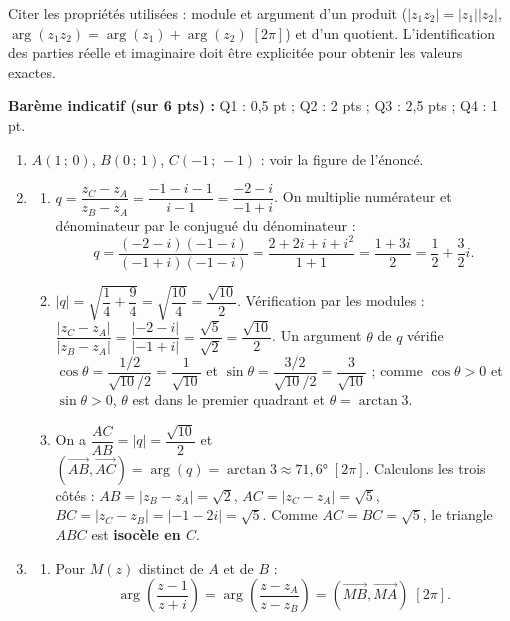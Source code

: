 \documentclass[11pt]{article}
\begin{document}
\begin{attention}
Citer les propriétés utilisées : module et argument d'un produit ($|z_1z_2| = |z_1||z_2|$, $\arg(z_1z_2) = \arg(z_1) + \arg(z_2)\;[2\pi]$) et d'un quotient. L'identification des parties réelle et imaginaire doit être explicitée pour obtenir les valeurs exactes.
\end{attention}

\begin{corrige}
\textbf{Barème indicatif (sur 6 pts) :} Q1 : 0,5 pt ; Q2 : 2 pts ; Q3 : 2,5 pts ; Q4 : 1 pt.

\begin{enumerate}
\item $A(1\,;\,0)$, $B(0\,;\,1)$, $C(-1\,;\,-1)$ : voir la figure de l'énoncé.
\item \begin{enumerate}
\item $q = \dfrac{z_C - z_A}{z_B - z_A} = \dfrac{-1 - i - 1}{i - 1} = \dfrac{-2 - i}{-1 + i}$. On multiplie numérateur et dénominateur par le conjugué du dénominateur :
\[ q = \frac{(-2 - i)(-1 - i)}{(-1 + i)(-1 - i)} = \frac{2 + 2i + i + i^2}{1 + 1} = \frac{1 + 3i}{2} = \frac{1}{2} + \frac{3}{2}i. \]
\item $|q| = \sqrt{\dfrac{1}{4} + \dfrac{9}{4}} = \sqrt{\dfrac{10}{4}} = \dfrac{\sqrt{10}}{2}$. Vérification par les modules : $\dfrac{|z_C - z_A|}{|z_B - z_A|} = \dfrac{|-2 - i|}{|-1 + i|} = \dfrac{\sqrt{5}}{\sqrt{2}} = \dfrac{\sqrt{10}}{2}$. Un argument $\theta$ de $q$ vérifie $\cos\theta = \dfrac{1/2}{\sqrt{10}/2} = \dfrac{1}{\sqrt{10}}$ et $\sin\theta = \dfrac{3/2}{\sqrt{10}/2} = \dfrac{3}{\sqrt{10}}$ ; comme $\cos\theta > 0$ et $\sin\theta > 0$, $\theta$ est dans le premier quadrant et $\theta = \arctan 3$.
\item On a $\dfrac{AC}{AB} = |q| = \dfrac{\sqrt{10}}{2}$ et $\left(\overrightarrow{AB}, \overrightarrow{AC}\right) = \arg(q) = \arctan 3 \approx 71{,}6°\;[2\pi]$. Calculons les trois côtés : $AB = |z_B - z_A| = \sqrt{2}$, $AC = |z_C - z_A| = \sqrt{5}$, $BC = |z_C - z_B| = |-1 - 2i| = \sqrt{5}$. Comme $AC = BC = \sqrt{5}$, le triangle $ABC$ est \textbf{isocèle en $C$}.
\end{enumerate}
\item \begin{enumerate}
\item Pour $M(z)$ distinct de $A$ et de $B$ :
\[ \arg\left(\frac{z - 1}{z + i}\right) = \arg\left(\frac{z - z_A}{z - z_B}\right) = \left(\overrightarrow{MB}, \overrightarrow{MA}\right)\;[2\pi]. \]

\end{enumerate}
\end{enumerate}
\end{corrige}
\end{document}
